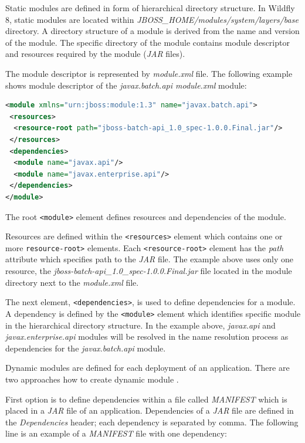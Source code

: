 \documentclass[12pt,oneside]{fithesis2}
\begin{document}
Static modules are defined in form of hierarchical directory structure. In Wildfly 8, static modules are located within \textit{JBOSS\_HOME/modules/system/layers/base} directory. A directory structure of a module is derived from the name and version of the module. The specific directory of the module contains module descriptor and resources required by the module (\textit{JAR} files).

The module descriptor is represented by \textit{module.xml} file. The following example shows module descriptor of the \textit{javax.batch.api module.xml} module:
\begin{lstlisting}[caption = Example of a module descriptor \cite{wildfly_book}, label = module_descriptor, language=XML]
<module xmlns="urn:jboss:module:1.3" name="javax.batch.api">
 <resources>
  <resource-root path="jboss-batch-api_1.0_spec-1.0.0.Final.jar"/>
 </resources>
 <dependencies>
  <module name="javax.api"/>
  <module name="javax.enterprise.api"/>
 </dependencies>    
</module>
\end{lstlisting}
\noindent	
The root \verb|<module>| element defines resources and dependencies of the module. 

Resources are defined within the \verb|<resources>| element which contains one or more \verb|resource-root>| elements. Each \verb|<resource-root>| element has the \textit{path} attribute which specifies path to the \textit{JAR} file. The example above uses only one resource, the \textit{jboss-batch-api\_1.0\_spec-1.0.0.Final.jar} file located in the module directory next to the \textit{module.xml} file.

The next element, \verb|<dependencies>|, is used to define dependencies for a module. A dependency is defined by the \verb|<module>| element which identifies specific module in the hierarchical directory structure. In the example above, \textit{javax.api} and \textit{javax.enterprise.api} modules will be resolved in the name resolution process as dependencies for the \textit{javax.batch.api} module.

Dynamic modules are defined for each deployment of an application. There are two approaches how to create dynamic module \cite{wildfly_book}.

First option is to define dependencies within a file called \textit{MANIFEST} which is placed in a \textit{JAR} file of an application. Dependencies of a \textit{JAR} file are defined in the \textit{Dependencies} header; each dependency is separated by comma. The following line is an example of a \textit{MANIFEST} file with one dependency:
\end{document}
